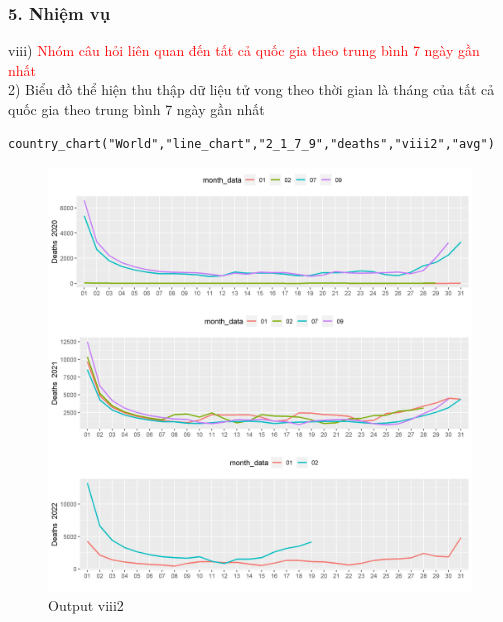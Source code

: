 \documentclass[english,10pt,table]{beamer}
\begin{document}
\begin{frame}[fragile]
\frametitle{5.  Nhiệm vụ}
viii) \textcolor{red}{Nhóm câu hỏi liên quan đến tất cả quốc gia theo trung bình 7 ngày gần nhất}\\
    2) Biểu đồ thể hiện thu thập dữ liệu tử vong theo thời gian là tháng của tất cả quốc gia theo trung bình 7 ngày gần nhất
\begin{lstlisting}[frame = single,basicstyle=\tiny]
country_chart("World","line_chart","2_1_7_9","deaths","viii2","avg")
    \end{lstlisting}
			\begin{figure}[h!]
	\begin{center}
		    \includegraphics[scale = 0.21]{Images/VIII/viii2 World .jpeg}
		     \caption{Output viii2}
		\end{center}
		\end{figure}
\end{frame}
\end{document}
